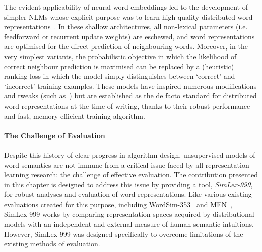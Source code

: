 The evident applicability of neural word embeddings led to the development of simpler NLMs whose explicit purpose was to learn high-quality distributed word representations~\citep{mikolov2013efficient}. In these shallow architectures, all non-lexical parameters (i.e. feedforward or recurrent update weights) are eschewed, and word representations are optimised for the direct prediction of neighbouring words. Moreover, in the very simplest variants, the probabilistic objective in which the likelihood of correct neighbour prediction is maximised can be replaced by a (heuristic) ranking loss in which the model simply distinguishes between `correct' and `incorrect' training examples. These models have inspired numerous modifications and tweaks (such as~\citealt{2014dependency,pennington2014glove,hill2014learning}) but are established as the de facto standard for distributed word representations at the time of writing, thanks to their robust performance and fast, memory efficient training algorithm.   

\paragraph{The Challenge of Evaluation} Despite this history of clear progress in algorithm design, unsupervised models of word semantics are not immune from a critical issue faced by all representation learning research: the challenge of effective evaluation. The contribution presented in this chapter is designed to address this issue by providing a tool, \emph{SimLex-999}, for robust analyses and evaluation of word representations. Like various existing evaluations created for this purpose, including WordSim-353~\citep{finkelstein2001placing} and MEN~\citep{bruni2014multimodal}, SimLex-999 works by comparing representation spaces acquired by distributional models with an independent and external measure of human semantic intuitions. However, SimLex-999 was designed specifically to overcome limitations of the existing methods of evaluation. 

